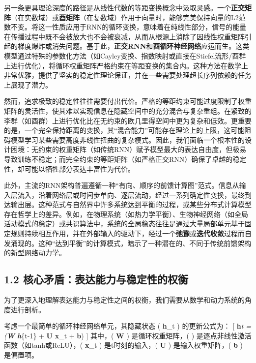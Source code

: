 \documentclass[
  12pt,
]{article}
\begin{document}
另一条更具理论深度的路径是从线性代数的等距变换概念中汲取灵感。一个\textbf{正交矩阵}（在实数域）或\textbf{酉矩阵}（在复数域）作用于向量时，能够完美保持向量的L2范数不变。将这一性质应用于RNN的循环变换，意味着在纯线性部分，信号的能量在传播过程中既不会被放大也不会被衰减，从而从根源上消除了因线性权重矩阵引起的梯度爆炸或消失问题。基于此，\textbf{正交RNN}和\textbf{酉循环神经网络}应运而生。这类模型通过特殊的参数化方法（如Cayley变换、指数映射或直接在Stiefel流形/酉群上进行优化），将循环权重矩阵严格约束在等距变换的集合内。这种方法在数学上非常优雅，提供了坚实的稳定性理论保证，并在一些需要处理超长序列依赖的任务上展现了潜力。

然而，追求极致的稳定性往往需要付出代价。严格的等距约束可能过度限制了权重矩阵的灵活性，使其难以实现信息在隐藏空间中的充分混合与复杂重组。在紧致的李群（如酉群）上进行优化比在无约束的欧几里得空间中更为复杂和低效。更重要的是，一个完全保持距离的变换，其``混合能力''可能存在理论上的上限，这可能阻碍模型学习某些需要高度非线性扭曲的复杂模式。因此，我们面临一个根本性的设计困境：无约束的权重矩阵（如传统RNN）赋予模型最大的表达自由度，但极易导致训练不稳定；而完全约束的等距矩阵（如严格正交RNN）确保了卓越的稳定性，却可能以牺牲部分表达丰富性为代价。

此外，主流的RNN架构普遍遵循一种``有向、顺序的前馈计算图''范式。信息从输入层流入，沿着网络层或时间步单向、逐层流动，经过一系列确定性变换，最终到达输出层。这种范式与自然界中许多系统达到平衡的过程，或某些分布式计算模型存在哲学上的差异。例如，在物理系统（如热力学平衡）、生物神经网络（如全局活动模式的稳定）或共识算法中，系统的全局稳态往往是通过大量局部单元基于固定规则持续相互作用，并在外部输入的驱动下，经过一个\textbf{弛豫}或\textbf{迭代收敛}过程而自发涌现的。这种``达到平衡''的计算模式，暗示了一种潜在的、不同于传统前馈架构的新型网络动力学。

\hypertarget{ux6838ux5fc3ux77dbux76feux8868ux8fbeux80fdux529bux4e0eux7a33ux5b9aux6027ux7684ux6743ux8861}{%
\subsection{1.2
核心矛盾：表达能力与稳定性的权衡}\label{ux6838ux5fc3ux77dbux76feux8868ux8fbeux80fdux529bux4e0eux7a33ux5b9aux6027ux7684ux6743ux8861}}

为了更深入地理解表达能力与稳定性之间的权衡，我们需要从数学和动力系统的角度进行剖析。

考虑一个最简单的循环神经网络单元，其隐藏状态 ( \textbf{h}\_t )
的更新公式为： {[} \textbf{h}\emph{t = \sigma(\textbf{W}
\textbf{h}}\{t-1\} + \textbf{U} \textbf{x}\_t + \textbf{b}) {]} 其中，(
\textbf{W} ) 是循环权重矩阵，( \sigma )
是逐点非线性激活函数（如tanh或ReLU），( \textbf{x}\_t ) 是t时刻的输入，(
\textbf{U} ) 是输入权重矩阵，( \textbf{b} ) 是偏置项。
\end{document}
